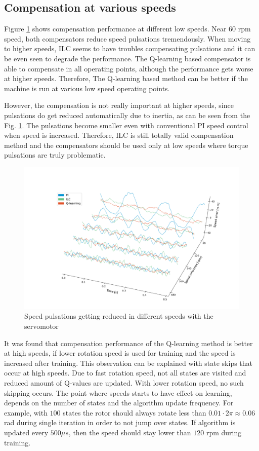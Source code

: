 \subsection{Compensation at various speeds}
Figure \ref{fig:compensation-various-speeds} shows compensation performance at different low speeds. Near $60$ rpm speed, both compensators reduce speed pulsations tremendously. When moving to higher speeds, ILC seems to have troubles compensating pulsations and it can be even seen to degrade the performance. The Q-learning based compensator is able to compensate in all operating points, although the performance gets worse at higher speeds. Therefore, The Q-learning based method can be better if the machine is run at various low speed operating points.

However, the compensation is not really important at higher speeds, since pulsations do get reduced automatically due to inertia, as can be seen from the Fig. \ref{fig:compensation-various-speeds}. The pulsations become smaller even with conventional PI speed control when speed is increased. Therefore, ILC is still totally valid compensation method and the compensators should be used only at low speeds where torque pulsations are truly problematic.
\begin{figure}[htb] 
    \centering
    \includegraphics[width=1.0\linewidth]{images/3d-sdm251-pulsation-compensation.pdf} 
    \caption{Speed pulsations getting reduced in different speeds with the servomotor}
    \label{fig:compensation-various-speeds}
\end{figure}

It was found that compensation performance of the Q-learning method is better at high speeds, if lower rotation speed is used for training and the speed is increased after training. This observation can be explained with state skips that occur at high speeds. Due to fast rotation speed, not all states are visited and reduced amount of Q-values are updated. With lower rotation speed, no such skipping occurs. The point where speeds starts to have effect on learning, depends on the number of states and the algorithm update frequency. For example, with $100$ states the rotor should always rotate less than $0.01 \cdot 2\pi \approx 0.06$ rad during single iteration in order to not jump over states. If algorithm is updated every $500 \mu s$, then the speed should stay lower than $120$ rpm during training.

\clearpage
